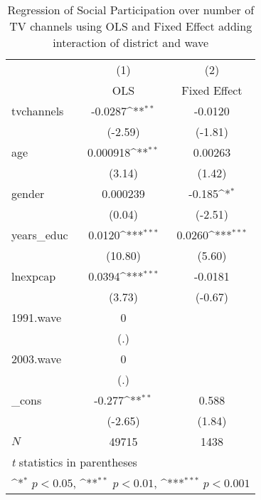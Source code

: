 \begin{table}[htbp]\centering
\def\sym#1{\ifmmode^{#1}\else\(^{#1}\)\fi}
\caption{ Regression of Social Participation over number of TV channels using OLS and Fixed Effect adding interaction of district and wave}
\begin{tabular}{l*{2}{c}}
\hline\hline
            &\multicolumn{1}{c}{(1)}&\multicolumn{1}{c}{(2)}\\
            &\multicolumn{1}{c}{OLS}&\multicolumn{1}{c}{Fixed Effect}\\
\hline
tvchannels  &     -0.0287\sym{**} &     -0.0120         \\
            &     (-2.59)         &     (-1.81)         \\
[1em]
age         &    0.000918\sym{**} &     0.00263         \\
            &      (3.14)         &      (1.42)         \\
[1em]
gender      &    0.000239         &      -0.185\sym{*}  \\
            &      (0.04)         &     (-2.51)         \\
[1em]
years\_educ  &      0.0120\sym{***}&      0.0260\sym{***}\\
            &     (10.80)         &      (5.60)         \\
[1em]
lnexpcap    &      0.0394\sym{***}&     -0.0181         \\
            &      (3.73)         &     (-0.67)         \\
[1em]
1991.wave   &           0         &                     \\
            &         (.)         &                     \\
[1em]
2003.wave   &           0         &                     \\
            &         (.)         &                     \\
[1em]
\_cons      &      -0.277\sym{**} &       0.588         \\
            &     (-2.65)         &      (1.84)         \\
\hline
\(N\)       &       49715         &        1438         \\
\hline\hline
\multicolumn{3}{l}{\footnotesize \textit{t} statistics in parentheses}\\
\multicolumn{3}{l}{\footnotesize \sym{*} \(p<0.05\), \sym{**} \(p<0.01\), \sym{***} \(p<0.001\)}\\
\end{tabular}
\end{table}
